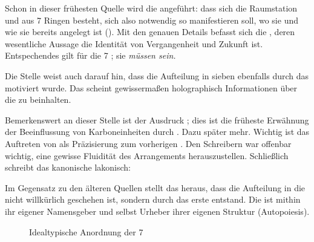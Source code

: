 Schon in dieser frühesten Quelle wird die  angeführt: dass sich die Raumstation  und aus 7 Ringen besteht, sich  also notwendig so manifestieren soll, wo sie und wie sie bereits angelegt ist (). Mit den genauen Details befasst sich die , deren wesentliche Aussage die Identität von Vergangenheit und Zukunft ist. Entspechendes gilt für die 7 ; sie \emph{müssen sein.}

Die Stelle weist auch darauf hin, dass die Aufteilung in sieben  ebenfalls durch das  motiviert wurde. Das  scheint gewissermaßen holographisch Informationen über die  zu beinhalten.
    

Bemerkenswert an dieser Stelle ist der Ausdruck ; dies ist die früheste Erwähnung der Beeinflussung von Karboneinheiten durch . Dazu später mehr. Wichtig ist das Auftreten von  als Präzisierung zum vorherigen . Den Schreibern war offenbar wichtig, eine gewisse Fluidität des Arrangements herauszustellen. Schließlich schreibt das kanonische  lakonisch:


Im Gegensatz zu den älteren Quellen stellt das  heraus, dass die Aufteilung in die  nicht willkürlich geschehen ist, sondern durch das erste  entstand. Die  ist mithin ihr eigener Namensgeber und selbst Urheber ihrer eigenen Struktur (Autopoiesis).

\begin{figure}[ht!]
    \centering
    
    \caption{Idealtypische Anordnung der 7 }
    \label{fig:ringconvention}
\end{figure}

